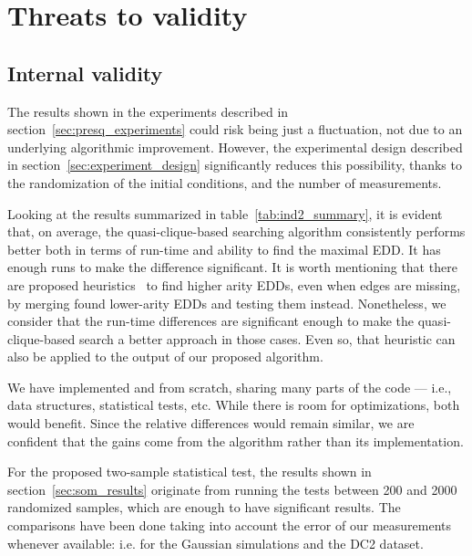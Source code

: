 \section{Threats to validity}
\label{sec:threats}

\subsection{Internal validity}

The \PresQ results shown in the experiments described in section~\ref{sec:presq_experiments}
could risk being just a fluctuation,
not due to an underlying algorithmic improvement. However,
the experimental design described in section~\ref{sec:experiment_design} significantly reduces
this possibility, thanks to the randomization of the initial conditions,
and the number of measurements.

Looking at the results summarized in table~\ref{tab:ind2_summary},
it is evident that, on average, the quasi-clique-based searching algorithm consistently performs
better both in terms of run-time and ability to find the maximal EDD.
It has enough runs to make the difference significant.
It is worth mentioning that there are proposed heuristics~\cite{koeller2003discovery} to find higher
arity \glspl{EDD}, even when edges are missing, by merging found lower-arity
\glspl{EDD} and testing them instead.
Nonetheless, we consider that the run-time differences are significant enough to make
the quasi-clique-based search a better approach in those cases.
Even so, that heuristic can also be applied to the output of our proposed algorithm.

We have implemented \Find and \PresQ from scratch, sharing 
many parts of the code --- i.e., data structures, statistical tests, etc.
While there is room for optimizations, both would benefit.
Since the relative differences would remain similar, we are confident that the gains come from the 
algorithm rather than its implementation.

\medskip

For the proposed two-sample statistical test, the results shown in
section~\ref{sec:som_results} originate from running the tests between 200 and 2000
randomized samples, which are enough to have significant results.
The comparisons have been done taking into account the error of our measurements whenever
available: i.e. for the Gaussian simulations and the DC2 dataset.

